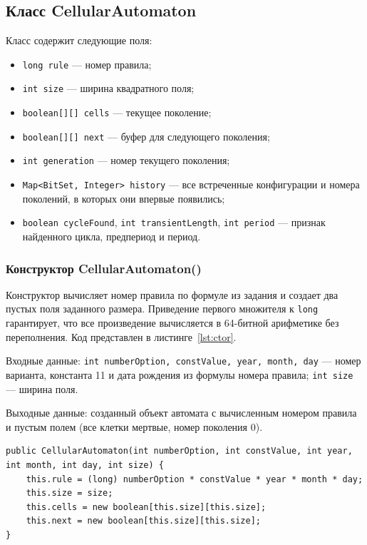 \documentclass[a4paper,14pt]{extarticle}
\begin{document}
\subsection{Класс CellularAutomaton}

Класс содержит следующие поля:
\begin{itemize}
	\item \texttt{long rule} --- номер правила;
	\item \texttt{int size} --- ширина квадратного поля;
	\item \texttt{boolean[][] cells} --- текущее поколение;
	\item \texttt{boolean[][] next} --- буфер для следующего поколения;
	\item \texttt{int generation} --- номер текущего поколения;
	\item \texttt{Map<BitSet, Integer> history} --- все встреченные конфигурации и номера поколений, в которых они впервые появились;
	\item \texttt{boolean cycleFound}, \texttt{int transientLength}, \texttt{int period} --- признак найденного цикла, предпериод и период.
\end{itemize}

\subsubsection*{Конструктор CellularAutomaton()}

Конструктор вычисляет номер правила по формуле из задания и создает два пустых поля заданного размера. Приведение первого множителя к \texttt{long} гарантирует, что все произведение вычисляется в 64-битной арифметике без переполнения. Код представлен в листинге~\ref{lst:ctor}.

Входные данные: \texttt{int numberOption, constValue, year, month, day} --- номер варианта, константа 11 и дата рождения из формулы номера правила; \texttt{int size} --- ширина поля.

Выходные данные: созданный объект автомата с вычисленным номером правила и пустым полем (все клетки мертвые, номер поколения 0).

\begin{lstlisting}[caption={Конструктор класса CellularAutomaton}, label={lst:ctor}]
public CellularAutomaton(int numberOption, int constValue, int year, int month, int day, int size) {
	this.rule = (long) numberOption * constValue * year * month * day;
	this.size = size;
	this.cells = new boolean[this.size][this.size];
	this.next = new boolean[this.size][this.size];
}
\end{lstlisting}
\end{document}
